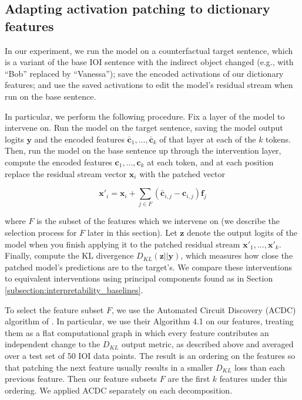 \subsection{Adapting activation patching to dictionary features}
\label{subsec:activation patching}


In our experiment, we run the model on a counterfactual target sentence, which is a variant of the base IOI sentence with the indirect object changed (e.g., with ``Bob'' replaced by ``Vanessa''); save the encoded activations of our dictionary features; and use the saved activations to edit the model's residual stream when run on the base sentence.

In particular, we perform the following procedure. Fix a layer of the model to intervene on. Run the model on the target sentence, saving the model output logits $\mathbf{y}$ and the encoded features $\bar{\mathbf{c}}_1, ..., \bar{\mathbf{c}}_k$ of that layer at each of the $k$ tokens. Then, run the model on the base sentence up through the intervention layer, compute the encoded features $\mathbf{c}_1, ..., \mathbf{c}_k$  at each token, and at each position replace the residual stream vector $\mathbf{x}_i$ with the patched vector

\[ \mathbf{x}'_i = \mathbf{x}_i + \displaystyle \sum_{j \in F} (\bar{\mathbf{c}}_{i,j} -\mathbf{c}_{i,j})\mathbf{f}_j\]

where $F$ is the subset of the features which we intervene on (we describe the selection process for $F$ later in this section). Let $\mathbf{z}$ denote the output logits of the model when you finish applying it to the patched residual stream $\mathbf{x}'_1,...,\mathbf{x}'_k$. Finally, compute the KL divergence $D_{KL}(\mathbf{z}||\mathbf{y})$, which measures how close the patched model's predictions are to the target's. We compare these interventions to equivalent interventions using principal components found as in Section \ref{subsection:interpretability_baselines}.

To select the feature subset $F$, we use the Automated Circuit Discovery (ACDC) algorithm of \citet{conmy2023towards}. In particular, we use their Algorithm 4.1 on our features, treating them as a flat computational graph in which every feature contributes an independent change to the $D_{KL}$ output metric, as described above and averaged over a test set of 50 IOI data points. The result is an ordering on the features so that patching the next feature usually results in a smaller $D_{KL}$ loss than each previous feature. Then our feature subsets $F$ are the first $k$ features under this ordering. We applied ACDC separately on each decomposition.


